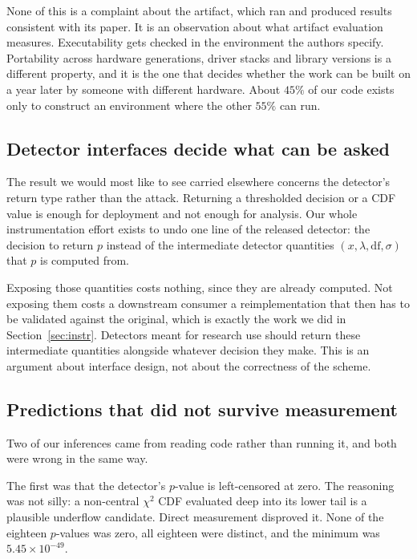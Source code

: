 \documentclass[10pt,twocolumn]{article}
\newcommand{\xstat}{\ensuremath{x}}
\newcommand{\lam}{\ensuremath{\lambda}}
\begin{document}
None of this is a complaint about the artifact, which ran and produced results
consistent with its paper. It is an observation about what artifact evaluation
measures. Executability gets checked in the environment the authors specify.
Portability across hardware generations, driver stacks and library versions is a
different property, and it is the one that decides whether the work can be built on a
year later by someone with different hardware. About $45\%$ of our code exists only to
construct an environment where the other $55\%$ can run.

\subsection{Detector interfaces decide what can be asked}

The result we would most like to see carried elsewhere concerns the detector's return
type rather than the attack. Returning a thresholded decision or a CDF value is enough
for deployment and not enough for analysis. Our whole instrumentation effort exists to
undo one line of the released detector: the decision to return $p$ instead of the
intermediate detector quantities $(\xstat, \lam, \mathrm{df}, \sigma)$ that $p$ is
computed from.

Exposing those quantities costs nothing, since they are already computed. Not exposing
them costs a downstream consumer a reimplementation that then has to be validated
against the original, which is exactly the work we did in
Section~\ref{sec:instr}. Detectors meant for research use should return these
intermediate quantities alongside whatever decision they make. This is an argument about
interface design, not about the correctness of the scheme.

\subsection{Predictions that did not survive measurement}

Two of our inferences came from reading code rather than running it, and both were
wrong in the same way.

The first was that the detector's $p$-value is left-censored at zero. The reasoning
was not silly: a non-central $\chi^2$ CDF evaluated deep into its lower tail is a
plausible underflow candidate. Direct measurement disproved it. None of the eighteen
$p$-values was zero, all eighteen were distinct, and the minimum was
$5.45 \times 10^{-49}$.
\end{document}

